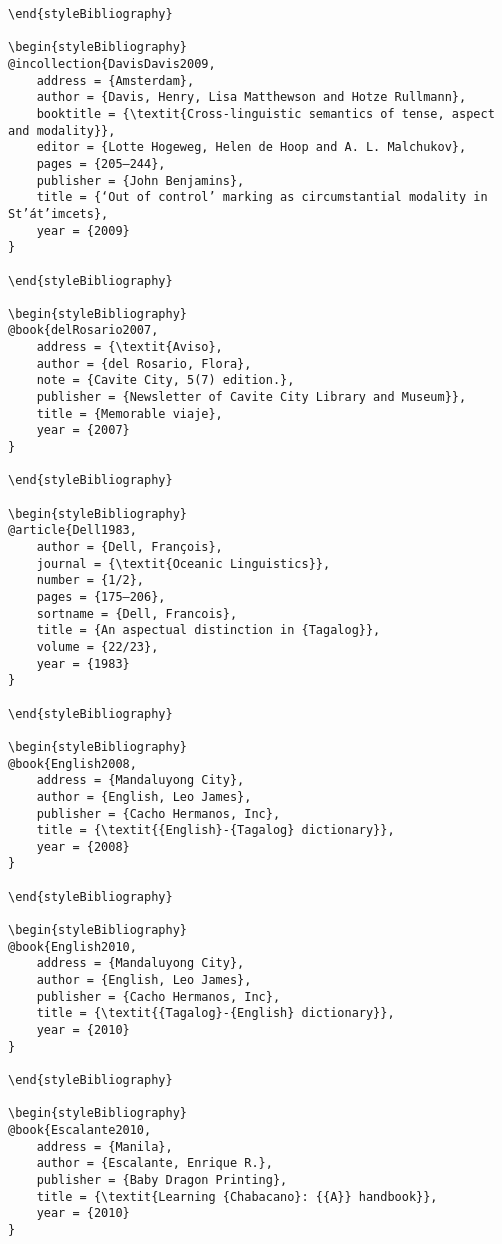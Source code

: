 \documentclass[output=paper]{langsci/langscibook}
\begin{document}
\begin{stylelsUnNumberedSection}
\begin{verbatim}
\end{styleBibliography}

\begin{styleBibliography}
@incollection{DavisDavis2009,
	address = {Amsterdam},
	author = {Davis, Henry, Lisa Matthewson and Hotze Rullmann},
	booktitle = {\textit{Cross-linguistic semantics of tense, aspect and modality}},
	editor = {Lotte Hogeweg, Helen de Hoop and A. L. Malchukov},
	pages = {205–244},
	publisher = {John Benjamins},
	title = {‘Out of control’ marking as circumstantial modality in St’át’imcets},
	year = {2009}
}

\end{styleBibliography}

\begin{styleBibliography}
@book{delRosario2007,
	address = {\textit{Aviso},
	author = {del Rosario, Flora},
	note = {Cavite City, 5(7) edition.},
	publisher = {Newsletter of Cavite City Library and Museum}},
	title = {Memorable viaje},
	year = {2007}
}

\end{styleBibliography}

\begin{styleBibliography}
@article{Dell1983,
	author = {Dell, François},
	journal = {\textit{Oceanic Linguistics}},
	number = {1/2},
	pages = {175–206},
	sortname = {Dell, Francois},
	title = {An aspectual distinction in {Tagalog}},
	volume = {22/23},
	year = {1983}
}

\end{styleBibliography}

\begin{styleBibliography}
@book{English2008,
	address = {Mandaluyong City},
	author = {English, Leo James},
	publisher = {Cacho Hermanos, Inc},
	title = {\textit{{English}-{Tagalog} dictionary}},
	year = {2008}
}

\end{styleBibliography}

\begin{styleBibliography}
@book{English2010,
	address = {Mandaluyong City},
	author = {English, Leo James},
	publisher = {Cacho Hermanos, Inc},
	title = {\textit{{Tagalog}-{English} dictionary}},
	year = {2010}
}

\end{styleBibliography}

\begin{styleBibliography}
@book{Escalante2010,
	address = {Manila},
	author = {Escalante, Enrique R.},
	publisher = {Baby Dragon Printing},
	title = {\textit{Learning {Chabacano}: {{A}} handbook}},
	year = {2010}
}


\end{verbatim}
\end{stylelsUnNumberedSection}
\end{document}
